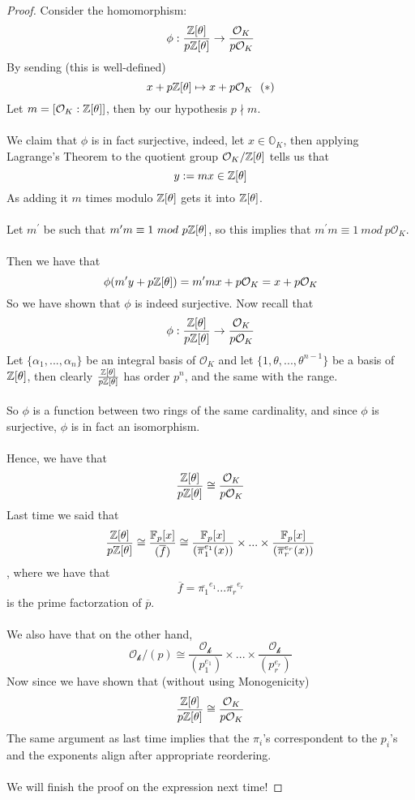 \begin{proof}
Consider the homomorphism:
\[\phi: \frac{\mathbb{Z}[\theta]}{p\mathbb{Z}[\theta]} \to \frac{\mathcal{O}_K}{p\mathcal{O}_K}\]
By sending (this is well-defined)
\[x + p \mathbb{Z}[\theta] \mapsto x + p \mathcal{O}_K\ \ (*)\]
Let $m = [\mathcal{O}_K : \mathbb{Z}[\theta]]$, then by our hypothesis $p \nmid m$.\\\\
We claim that $\phi$ is in fact surjective, indeed, let $x \in \mathbb{O}_K$, then applying Lagrange's Theorem to the quotient group $\mathcal{O}_K/\mathbb{Z}[\theta]$ tells us that
\[y := mx \in \mathbb{Z}[\theta]\]
As adding it $m$ times modulo $\mathbb{Z}[\theta]$ gets it into $\mathbb{Z}[\theta]$.\\\\
Let $m^\prime$ be such that $m^\prime m \equiv 1\ mod\ p\Zbb[\theta]$, so this implies that $m^\prime m \equiv 1\ mod\ p\mathcal{O}_K$.\\\\
Then we have that
\[\phi(m^\prime y + p \mathbb{Z}[\theta]) = m^\prime mx + p \mathcal{O}_K = x + p \mathcal{O}_K \]
So we have shown that $\phi$ is indeed surjective. Now recall that
\[\phi: \frac{\mathbb{Z}[\theta]}{p\mathbb{Z}[\theta]} \to \frac{\mathcal{O}_K}{p\mathcal{O}_K}\]
Let $\{\alpha_1, ..., \alpha_n\}$ be an integral basis of $\mathcal{O}_K$ and let $\{1, \theta, ..., \theta^{n-1}\}$ be a basis of $\mathbb{Z}[\theta]$, then clearly $\frac{\mathbb{Z}[\theta]}{p\mathbb{Z}[\theta]}$ has order $p^n$, and the same with the range.\\\\
So $\phi$ is a function between two rings of the same cardinality, and since $\phi$ is surjective, $\phi$ is in fact an isomorphism.\\\\
Hence, we have that
\[\frac{\mathbb{Z}[\theta]}{p\mathbb{Z}[\theta]} \cong \frac{\mathcal{O}_K}{p\mathcal{O}_K}\]
Last time we said that
\[\frac{\mathbb{Z}[\theta]}{p\mathbb{Z}[\theta]} \cong \frac{\mathbb{F}_p[x]}{(\overline{f})} \cong \frac{\mathbb{F}_p[x]}{(\overline{\pi}_1^{e_1}(x))} \times ... \times \frac{\mathbb{F}_p[x]}{(\overline{\pi}_r^{e_r}(x))}\]
, where we have that
\[\overline{f} = \overline{\pi_1}^{e_1} ... \overline{\pi_r}^{e_r}\] is the prime factorzation of $\overline{p}$.\\\\
We also have that on the other hand,
\[\mathcal{O_k}/(p) \cong \frac{\mathcal{O_k}}{(p_1^{e_1})} \times ... \times \frac{\mathcal{O_k}}{(p_r^{e_r})}\]
Now since we have shown that (without using Monogenicity)
\[\frac{\mathbb{Z}[\theta]}{p\mathbb{Z}[\theta]} \cong \frac{\mathcal{O}_K}{p\mathcal{O}_K}\]
The same argument as last time implies that the $\pi_i$'s correspondent to the $p_i$'s and the exponents align after appropriate reordering.\\\\
We will finish the proof on the expression next time!
\end{proof}

